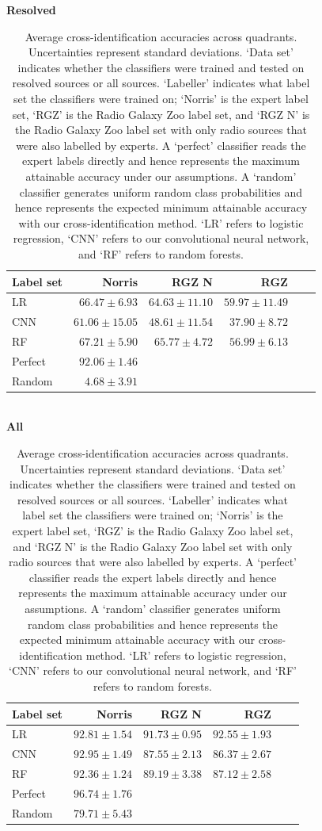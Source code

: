 \documentclass[fleqn,usenatbib,usedcolumn]{mnras}
\begin{document}
  \begin{table}
    \caption{Average cross-identification accuracies across quadrants.
      Uncertainties represent standard deviations. `Data set' indicates whether
      the classifiers were trained and tested on resolved sources or all
      sources. `Labeller' indicates what label set the classifiers were trained
      on; `Norris' is the expert label set, `RGZ' is the Radio Galaxy Zoo label
      set, and `RGZ N' is the Radio Galaxy Zoo label set with only radio sources
      that were also labelled by experts. A `perfect' classifier reads the
      expert labels directly and hence represents the maximum attainable
      accuracy under our assumptions. A `random' classifier generates uniform
      random class probabilities and hence represents the expected minimum
      attainable accuracy with our cross-identification method. `LR' refers to
      logistic regression, `CNN' refers to our convolutional neural network, and
      `RF' refers to random forests.}
    \label{tab:cross-id-accuracies}
    {\bf Resolved}\\
    \begin{tabular}{l|rrrrr}
      \hline
      Label set & Norris & RGZ N & RGZ\\
      \hline
      LR & $66.47 \pm 6.93$ & $64.63 \pm 11.10$ & $59.97 \pm 11.49$\\
      CNN & $61.06 \pm 15.05$ & $48.61 \pm 11.54$ & $37.90 \pm 8.72$\\
      RF & $67.21 \pm 5.90$ & $65.77 \pm 4.72$ & $56.99 \pm 6.13$\\
      Perfect & $92.06 \pm 1.46$\\
      Random & $4.68 \pm 3.91$\\
    \end{tabular}\\

    {\bf All}\\
    \begin{tabular}{l|rrrrr}
      \hline
      Label set & Norris & RGZ N & RGZ\\
      \hline
      LR & $92.81 \pm 1.54$& $91.73 \pm 0.95$& $92.55 \pm 1.93$\\
      CNN & $92.95 \pm 1.49$& $87.55 \pm 2.13$& $86.37 \pm 2.67$\\
      RF & $92.36 \pm 1.24$& $89.19 \pm 3.38$& $87.12 \pm 2.58$\\
      Perfect & $96.74 \pm 1.76$\\
      Random & $79.71 \pm 5.43$\\
      \hline
    \end{tabular}
  \end{table}
\end{document}
